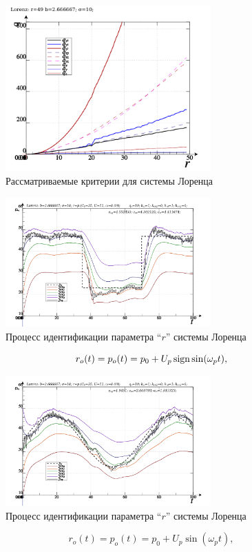 \begin{figure}[h!]
  \centerline{\includegraphics[width=0.7\textwidth]{p/cha/lor/lor_q-p_r.png} }
  \caption{Рассматриваемые критерии для системы Лоренца}
  \label{atu:f:lor_q}
\end{figure}

\begin{figure}[h!]
  \centerline{\includegraphics[width=0.7\textwidth]{p/cha/lor/lor_m5pf-pl_n_sign.png} }
  \caption{Процесс идентификации параметра ``$r$'' системы Лоренца}
  \label{atu:f:lor_id_mp5_sign}
\end{figure}

\[
  r_o(t) = p_o(t) = p_0 +  U_{p} \operatorname*{sign} \sin( \omega_{p} t ),
\]


\begin{figure}[h!]
  \centerline{\includegraphics[width=0.7\textwidth]{p/cha/lor/lor_m5pf-pl_n_sin.png} }
  \caption{Процесс идентификации параметра ``$r$'' системы Лоренца}
  \label{atu:f:lor_id_mp5_sin}
\end{figure}

\[
  r_o(t) = p_o(t) = p_0 +  U_{p} \sin( \omega_{p} t ),
\]



